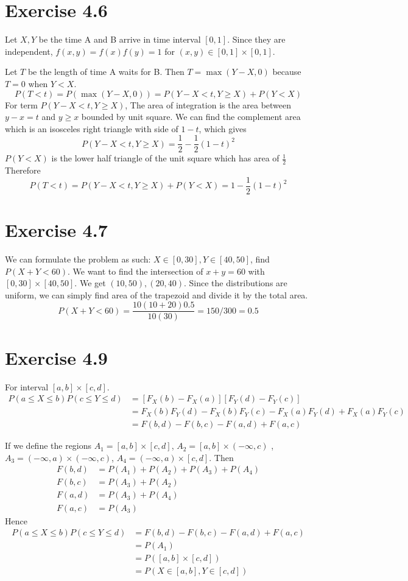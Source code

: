 \documentclass[12pt]{article}
\begin{document}
\section*{Exercise 4.6}
Let $X, Y$ be the time A and B arrive in time interval $[0,1]$. Since they are independent, $f(x,y) = f(x) f(y) = 1$ for $(x,y) \in [0,1]\times [0,1]$.

Let $T$ be the length of time A waits for B. Then $T = \max (Y - X, 0)$ because $T=0$ when $Y < X$. 
$$ P(T < t) = P(\max (Y - X, 0)) = P(Y - X < t, Y \geq X) + P(Y < X)$$ 
For term $P(Y - X < t, Y \geq X)$, The area of integration is the area between $y - x = t$ and $ y \geq x$ bounded by unit square. We can find the complement area which is an isosceles right triangle with side of $1-t$, which gives
$$ P(Y - X < t, Y \geq X) =   \frac{1}{2} - \frac{1}{2} (1-t)^2$$
$P(Y<X)$ is the lower half triangle of the unit square which has area of $\frac{1}{2}$
Therefore 
$$P(T < t) = P(Y - X < t, Y \geq X) + P(Y < X) = 1 - \frac{1}{2} (1-t)^2$$


\section*{Exercise 4.7}
We can formulate the problem as such: $X \in [0,30], Y \in [40,50]$, find $P(X+Y < 60)$. We want to find the intersection of $x+y=60$ with $[0,30] \times [40, 50]$. We get $(10,50), (20,40)$. Since the distributions are uniform, we can simply find area of the trapezoid and divide it by the total area. 
$$P(X+Y < 60) = \frac{10(10 + 20)0.5}{10(30)} = 150/300 = 0.5$$

\section*{Exercise 4.9}
For interval $[a,b] \times [c,d]$.
$$\begin{aligned} 
P(a \leq X \leq b) P(c \leq Y \leq d) &= [F_X(b)-F_X(a)] [F_Y(d)-F_Y(c)] \\ 
&= F_X(b)F_Y(d)-F_X(b)F_Y(c)-F_X(a)F_Y(d) + F_X(a)F_Y(c)  \\
&= F(b,d)-F(b,c)-F(a,d)+F(a,c)
\end{aligned}$$

If we define the regions $A_1 = [a,b]\times[c,d]$, $A_2=[a,b]\times(-\infty, c)$ , $A_3=(-\infty, a)\times(-\infty, c)$, $A_4 = (-\infty, a)\times [c,d]$. Then
   $$\begin{aligned}
   		F(b,d) &= P(A_1)+P(A_2)+P(A_3)+P(A_4) \\
   		F(b,c) &= P(A_3) + P(A_2) \\
   		F(a,d) &= P(A_3) + P(A_4) \\
   		F(a,c) &= P(A_3)
   \end{aligned}$$
Hence 
$$\begin{aligned}
P(a \leq X \leq b) P(c \leq Y \leq d) &= F(b,d)-F(b,c)-F(a,d)+F(a,c) \\
&= P(A_1)  \\
&= P([a,b]\times[c,d])  \\
&= P(X\in [a,b], Y\in [c,d])
\end{aligned}$$
\end{document}
